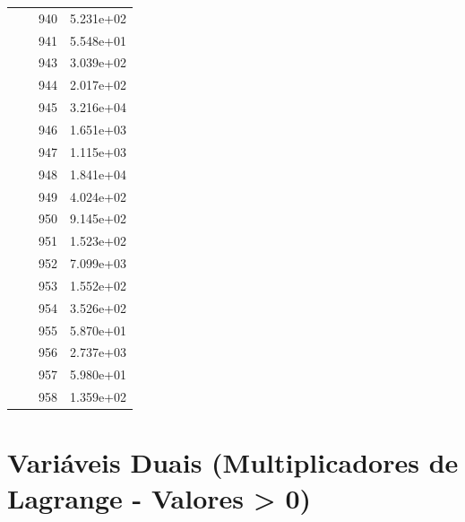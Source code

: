 \documentclass[12pt]{article}
\begin{document}
\begin{longtable}{@{}cccc@{}}
 &  & 940 & 5.231e+02 \\
 &  & 941 & 5.548e+01 \\
 &  & 943 & 3.039e+02 \\
 &  & 944 & 2.017e+02 \\
 &  & 945 & 3.216e+04 \\
 &  & 946 & 1.651e+03 \\
 &  & 947 & 1.115e+03 \\
 &  & 948 & 1.841e+04 \\
 &  & 949 & 4.024e+02 \\
 &  & 950 & 9.145e+02 \\
 &  & 951 & 1.523e+02 \\
 &  & 952 & 7.099e+03 \\
 &  & 953 & 1.552e+02 \\
 &  & 954 & 3.526e+02 \\
 &  & 955 & 5.870e+01 \\
 &  & 956 & 2.737e+03 \\
 &  & 957 & 5.980e+01 \\
 &  & 958 & 1.359e+02 \\

\bottomrule
\end{longtable}


\section{Variáveis Duais (Multiplicadores de Lagrange - Valores > 0)}
\end{document}
